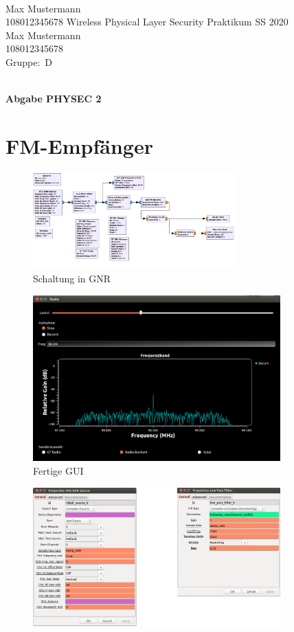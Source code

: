 \documentclass[12pt,a4paper]{article}
\newcommand{\student}{Max Mustermann\\ 108012345678 } %
\newcommand{\partner}{Max Mustermann\\ 108012345678} %
\newcommand{\thirdone}{Max Mustermann\\ 108012345678}
\newcommand{\group}{D} %
\newcommand{\hwheadtwo}{$ $
  \vspace{-2cm}
  
\noindent \student \qquad \qquad  Wireless Physical Layer Security Praktikum \hfill SS 2020 \\
\noindent \partner \\
\noindent Gruppe:~\group\\
$ $

  
\begin{center}    
{\Large \bf Abgabe PHYSEC 2}
\end{center}
}
\begin{document}
\hwheadtwo

\section{FM-Empfänger}



 
\begin{figure}[hbt!]
\centering
	\includegraphics[width=0.7\textwidth ]{Bilder/Aufgabe1-gesamt-grc.png}
	\caption{Schaltung in GNR}
	\label{fig:Label1}
\end{figure}



\begin{figure}[hbt!]
\centering
	\includegraphics[width=0.85\textwidth ]{Bilder/Aufgabe1-gui.png}
	\caption{Fertige GUI}
	\label{fig:Label2}
\end{figure}


\begin{figure}[hbt!]
\centering
	\includegraphics[width=0.85\textwidth ]{Bilder/Aufgabe1-properties1.png}
\end{figure}
\end{document}
